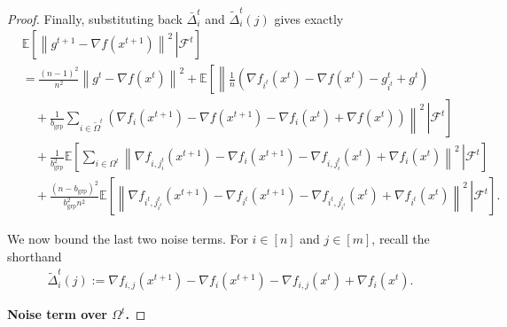 \documentclass{article}
\newcommand{\sqn}[1]{\left\| #1 \right\|^2}
\newcommand{\eqdef}{:=}
\newcommand{\Expb}[2]{\mathbb{E}\!\left[\left. #1\,\right|#2 \right]}
\newcommand{\Expc}[1]{\Expb{#1}{\mathcal{F}^t}}
\theoremstyle{plain}
\begin{document}
\begin{proof}
Finally, substituting back $\bar{\Delta}_i^t$ and $\widetilde{\Delta}_i^t(j)$ gives exactly
\begin{align*}
&\Expc{ \sqn{g^{t+1}-\nabla f(x^{t+1})}}\\
&=\frac{(n-1)^2}{n^2} \sqn{g^t-\nabla f(x^{t})}
+\mathbb{E}\!\left[\left\|\frac{1}{n}\left(\nabla f_{i^t}(x^{t})-\nabla f(x^{t})-g_{i^t}^t+g^t\right)\right.\right.\\
&\quad\left.\left.\left.\!\!\!{}+\frac{1}{b_{\mathrm{grp}}} \sum_{i\in \tilde{\Omega}^t}\left( \nabla f_{i}(x^{t+1})-\nabla f(x^{t+1})-\nabla f_{i}(x^{t})+\nabla f(x^{t})\right)\right\|^2\,\right|\mathcal{F}^t\right]\\
&\quad+\frac{1}{b_{\mathrm{grp}}^2}\Expc{ \sum_{i\in \Omega^t}\sqn{ \nabla f_{i,j_i^t}(x^{t+1})-\nabla f_i(x^{t+1})-\nabla f_{i,j_i^t}(x^{t})+\nabla f_i(x^t)}}\\
&\quad+\frac{(n-b_{\mathrm{grp}})^2}{b_{\mathrm{grp}}^2n^2}\Expc{ \sqn{ \nabla f_{i^t,j_{i^t}^t}(x^{t+1})-\nabla f_{i^t}(x^{t+1})-\nabla f_{i^t,j_{i^t}^t}(x^{t})+\nabla f_{i^t}(x^t)}}.
\end{align*}


We now bound the last two noise terms.
For $i\in[n]$ and $j\in[m]$, recall the shorthand
\begin{align*}
\widetilde{\Delta}_i^t(j)\eqdef \nabla f_{i,j}(x^{t+1})-\nabla f_i(x^{t+1})-\nabla f_{i,j}(x^{t})+\nabla f_i(x^{t}).
\end{align*}

\textbf{Noise term over $\Omega^t$.}


\end{proof}
\end{document}
